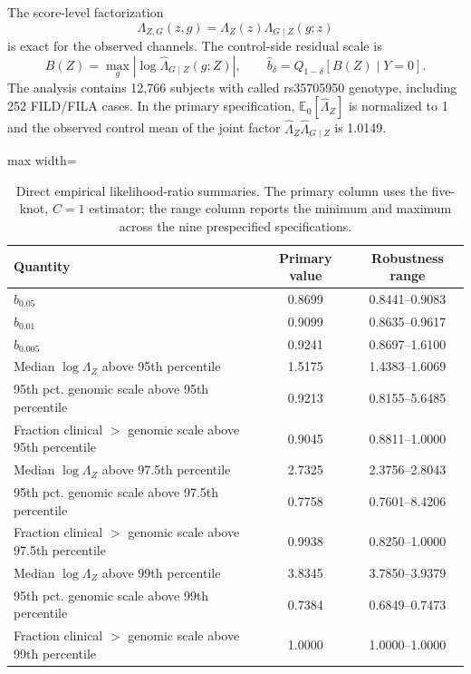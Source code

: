 The score-level factorization
\begin{equation}
\Lambda_{Z,G}(z,g)=\Lambda_Z(z)\Lambda_{G\mid Z}(g;z)
\end{equation}
is exact for the observed channels. The control-side residual scale is
\begin{equation}
B(Z)=\max_g|\log\widehat\Lambda_{G\mid Z}(g;Z)|,
\qquad
\widehat b_\delta=Q_{1-\delta}[B(Z)\mid Y=0].
\end{equation}
The analysis contains 12,766 subjects with called rs35705950 genotype, including 252 FILD/FILA cases. In the primary specification, $\mathbb E_0[\widehat\Lambda_Z]$ is normalized to 1 and the observed control mean of the joint factor $\widehat\Lambda_Z\widehat\Lambda_{G\mid Z}$ is 1.0149.

\begin{table}[!t]
\caption{Direct empirical likelihood-ratio summaries. The primary column uses the five-knot, $C=1$ estimator; the range column reports the minimum and maximum across the nine prespecified specifications.}
\label{tab:supp-lr-summary}
\centering\footnotesize
\setlength{\tabcolsep}{5pt}
\renewcommand{\arraystretch}{1.03}
\begin{adjustbox}{max width=\textwidth}
\begin{tabular}{lcc}
\toprule
Quantity & Primary value & Robustness range\\
\midrule
$\widehat b_{0.05}$ & 0.8699 & 0.8441--0.9083\\
$\widehat b_{0.01}$ & 0.9099 & 0.8635--0.9617\\
$\widehat b_{0.005}$ & 0.9241 & 0.8697--1.6100\\
Median $\log \Lambda_Z$ above 95th percentile & 1.5175 & 1.4383--1.6069\\
95th pct. genomic scale above 95th percentile & 0.9213 & 0.8155--5.6485\\
Fraction clinical $>$ genomic scale above 95th percentile & 0.9045 & 0.8811--1.0000\\
Median $\log \Lambda_Z$ above 97.5th percentile & 2.7325 & 2.3756--2.8043\\
95th pct. genomic scale above 97.5th percentile & 0.7758 & 0.7601--8.4206\\
Fraction clinical $>$ genomic scale above 97.5th percentile & 0.9938 & 0.8250--1.0000\\
Median $\log \Lambda_Z$ above 99th percentile & 3.8345 & 3.7850--3.9379\\
95th pct. genomic scale above 99th percentile & 0.7384 & 0.6849--0.7473\\
Fraction clinical $>$ genomic scale above 99th percentile & 1.0000 & 1.0000--1.0000\\
\bottomrule
\end{tabular}
\end{adjustbox}
\end{table}


